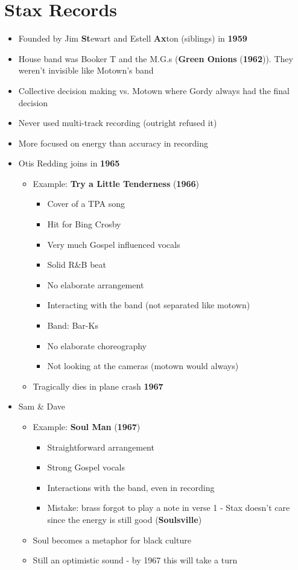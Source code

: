 \documentclass[11pt]{report}
\newcommand{\imp}[1]{\textbf{#1}}
\newcommand{\idate}[2]{\textcolor{blue!50}{\imp{#1}}\label{date:#2}}
\newcommand{\bl}{\begin{itemize}}
\newcommand{\kl}{\end{itemize}}
\newcommand{\song}[2]{\textcolor{red!70}{\textbf{#1}} (\idate{#2}{#1})}
\begin{document}
\section{Stax Records}
\begin{itemize}
	\item Founded by Jim \textbf{St}ewart and Estell \textbf{Ax}ton (siblings) in \idate{1959}{stax-founded}
	\item House band was Booker T and the M.G.s (\song{Green Onions}{1962}). They weren't invisible like Motown's band
	\item Collective decision making vs. Motown where Gordy always had the final decision
	\item Never used multi-track recording (outright refused it)
	\item More focused on energy than accuracy in recording
	\item Otis Redding joins in \idate{1965}{otis-redding-stax}
	\bl
		\item Example: \song{Try a Little Tenderness}{1966}
		\bl
			\item Cover of a TPA song
			\item Hit for Bing Crosby
			\item Very much Gospel influenced vocals
			\item Solid R\&B beat
			\item No elaborate arrangement
			\item Interacting with the band (not separated like motown)
			\item Band: Bar-Ks
			\item No elaborate choreography
			\item Not looking at the cameras (motown would always)
		\kl
		\item Tragically dies in plane crash \idate{1967}{otis-redding-dead}
	\kl
	\item Sam \& Dave
	\bl
		\item Example: \song{Soul Man}{1967}
		\bl
			\item Straightforward arrangement
			\item Strong Gospel vocals
			\item Interactions with the band, even in recording
			\item Mistake: brass forgot to play a note in verse 1 - Stax doesn't care since the energy is still good (\textbf{Soulsville})
		\kl
		\item Soul becomes a metaphor for black culture
		\item Still an optimistic sound - by 1967 this will take a turn
	\kl
\end{itemize}
\end{document}
